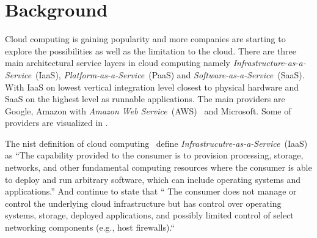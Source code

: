 \chapter{Background}




Cloud computing is gaining popularity and more companies are starting 
to explore the possibilities as well as the limitation to the cloud.
There are three main architectural service layers in cloud computing\cite{introduction:wozniak10}
namely \emph{Infrastructure-as-a-Service}~(IaaS), \emph{Platform-as-a-Service}~(PaaS)
and \emph{Software-as-a-Service}~(SaaS).
With IaaS on lowest vertical integration level closest to physical hardware and SaaS on the highest
level as runnable applications.
The main providers are Google, Amazon with \emph{Amazon Web Service}~(AWS)~\cite{aws} and Microsoft.
Some of providers are visualized in .



The nist definition of cloud computing~\cite{nist:mell11}
define \emph{Infrastrucutre-as-a-Service}~(IaaS) as
``The capability provided to the consumer is to provision 
processing, storage, networks, and other fundamental computing resources where the 
consumer is able to deploy and run arbitrary software, which can include operating 
systems and applications.'' 
And continue to state that `` The consumer does not manage or control the underlying cloud 
infrastructure but has control over operating systems, storage, deployed applications, and 
possibly limited control of select networking components (e.g., host firewalls).``

